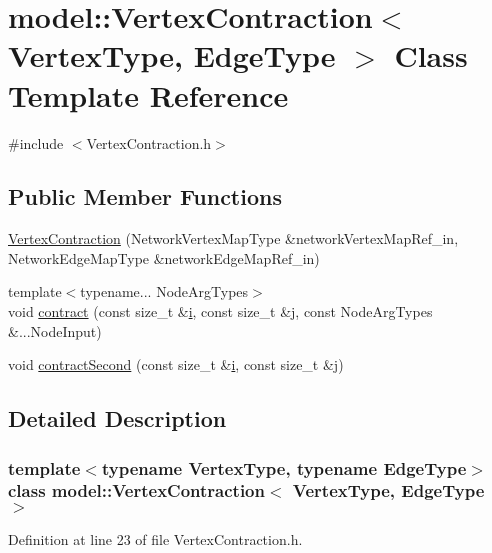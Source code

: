 \hypertarget{classmodel_1_1_vertex_contraction}{}\section{model\+:\+:Vertex\+Contraction$<$ Vertex\+Type, Edge\+Type $>$ Class Template Reference}
\label{classmodel_1_1_vertex_contraction}


{\ttfamily \#include $<$Vertex\+Contraction.\+h$>$}

\subsection*{Public Member Functions}
\begin{DoxyCompactItemize}
\item 
\hyperlink{classmodel_1_1_vertex_contraction_a7cc1d24605365f0040e10f051bda14e8}{Vertex\+Contraction} (Network\+Vertex\+Map\+Type \&network\+Vertex\+Map\+Ref\+\_\+in, Network\+Edge\+Map\+Type \&network\+Edge\+Map\+Ref\+\_\+in)
\item 
{\footnotesize template$<$typename... Node\+Arg\+Types$>$ }\\void \hyperlink{classmodel_1_1_vertex_contraction_ad8672b7145b16cda3fa05cb92c77078c}{contract} (const size\+\_\+t \&\hyperlink{_cubic_spline_intersection_8m_a6f6ccfcf58b31cb6412107d9d5281426}{i}, const size\+\_\+t \&j, const Node\+Arg\+Types \&...Node\+Input)
\item 
void \hyperlink{classmodel_1_1_vertex_contraction_ab334f302ae76324eb9af76d8af9cbbd4}{contract\+Second} (const size\+\_\+t \&\hyperlink{_cubic_spline_intersection_8m_a6f6ccfcf58b31cb6412107d9d5281426}{i}, const size\+\_\+t \&j)
\end{DoxyCompactItemize}


\subsection{Detailed Description}
\subsubsection*{template$<$typename Vertex\+Type, typename Edge\+Type$>$class model\+::\+Vertex\+Contraction$<$ Vertex\+Type, Edge\+Type $>$}



Definition at line 23 of file Vertex\+Contraction.\+h.



